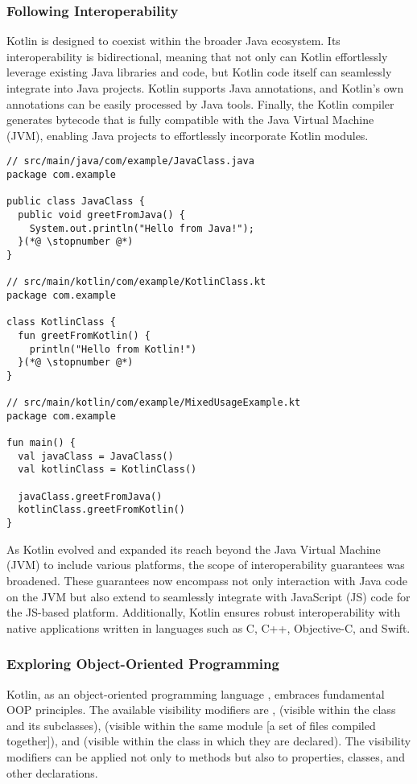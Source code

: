 \subsubsection{Following Interoperability}

Kotlin is designed to coexist within the broader Java ecosystem. Its interoperability is bidirectional, meaning that 
not only can Kotlin effortlessly leverage existing Java libraries and code, but Kotlin code itself can seamlessly 
integrate into Java projects. Kotlin supports Java annotations, and Kotlin's own annotations can be easily processed by 
Java tools. Finally, the Kotlin compiler generates bytecode that is fully compatible with the Java Virtual Machine (JVM), 
enabling Java projects to effortlessly incorporate Kotlin modules. 

\begin{lstlisting}
// src/main/java/com/example/JavaClass.java
package com.example

public class JavaClass {
  public void greetFromJava() {
    System.out.println("Hello from Java!");
  }(*@ \stopnumber @*)
} 

// src/main/kotlin/com/example/KotlinClass.kt 
package com.example

class KotlinClass {
  fun greetFromKotlin() {
    println("Hello from Kotlin!")
  }(*@ \stopnumber @*)
}

// src/main/kotlin/com/example/MixedUsageExample.kt
package com.example

fun main() {
  val javaClass = JavaClass()
  val kotlinClass = KotlinClass()

  javaClass.greetFromJava()
  kotlinClass.greetFromKotlin()
}
\end{lstlisting}

\noindent As Kotlin evolved and expanded its reach beyond the Java Virtual Machine (JVM) to include various platforms, 
the scope of interoperability guarantees was broadened. These guarantees now encompass not only interaction with Java 
code on the JVM but also extend to seamlessly integrate with JavaScript (JS) code for the JS-based platform. 
Additionally, Kotlin ensures robust interoperability with native applications written in languages such as C, C++, 
Objective-C, and Swift.


\subsubsection{Exploring Object-Oriented Programming}

Kotlin, as an object-oriented programming language \cite{Khan18}, embraces fundamental OOP principles. The available 
visibility modifiers are ,  (visible within the class and its subclasses),  (visible 
within the same module [a set of files compiled together]), and  (visible within the class in which they are 
declared). The visibility modifiers can be applied not only to methods but also to properties, classes, and other 
declarations. 

